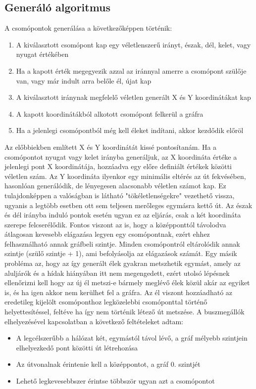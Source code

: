 \subsection{Generáló algoritmus}
A csomópontok generálása a következőképpen történik:
\begin{enumerate}
\item A kiválasztott csomópont kap egy véletlenszerű irányt, észak, dél, kelet, vagy nyugat értékében
\item Ha a kapott érték megegyezik azzal az iránnyal amerre a csomópont szülője van, vagy már indult arra belőle él, újat kap
\item A kiválasztott iránynak megfelelő véletlen generált X és Y koordinátákat kap
\item A kapott koordinátákból alkotott csomópont felkerül a gráfra
\item Ha a jelenlegi csomópontból még kell éleket indítani, akkor kezdődik előröl
\end{enumerate}
Az előbbiekben említett X és Y koordinátát kissé pontosítanám. Ha a csomópontot nyugat vagy kelet irányba generáljuk, az X koordináta értéke a jelenlegi pont X koordinátája, hozzáadva egy
előre definiált értékek közötti véletlen szám. Az Y koordináta ilyenkor egy minimális eltérés az út fekvésében, hasonlóan generálódik, de lényegesen alacsonabb véletlen számot kap. Ez
tulajdonképpen a valóságban is látható "tökéletlenségekre" vezethető vissza, ugyanis a legtöbb esetben ott sem teljesen merőleges egymásra kettő út. Az észak és dél irányba induló pontok 
esetén ugyan ez az eljárás, csak a két koordináta szerepe felcserélődik.
Fontos viszont az is, hogy a középponttól távolodva átlagosan kevesebb elágazása legyen egy csomópontnak, ezért ehhez felhasználható annak gráfbeli szintje. Minden csomópontról eltárolódik 
annak szintje (szülő szintje + 1), ami befolyásolja az elágazások számát. Egy másik probléma az, hogy az így generált élek gyakran metszhetik egymást, amely az aluljárók és a hídak hiányában 
itt nem megengedett, ezért utolsó lépésnek ellenőrizni kell hogy az új él metszi-e bármely meglévő élek közül akár az egyiket is, és ha igen akkor nem kerülhet fel a gráfra. Az él viszont hozzáadható 
az eredetileg kijelölt csomóponthoz legközelebbi csomóponttal történő helyettesítéssel, feltéve ha így nem történik létező út metszése.
A buszmegállók elhelyezésével kapcsolatban a következő feltételeket
adtam:
\begin{itemize}
\item A legcélszerűbb a hálózat két, egymástól távol lévő, a gráf mélyebb szintjein elhelyezkedő pont közötti út létrehozása
\item Az útvonalnak érintenie kell a középpontot, a gráf 0. szintjét
\item Lehető legkevesebbszer érintse többször ugyan azt a csomópontot
\end{itemize}
